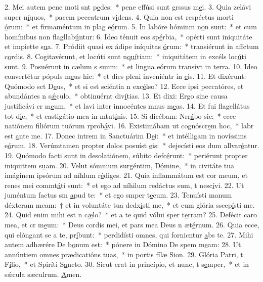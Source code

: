 2. Mei autem pene moti snt p\uline{e}des:~* pene effúsi sunt grssus m\uline{e}i.
3. Quia zelávi super n\uline{í}quos,~* pacem peccatrum v\uline{i}dens.
4. Quia non est respéctus morti \uline{ó}rum:~* et firmaméntum in plag e\uline{ó}rum.
5. In labóre hóminm n\uline{o}n sunt:~* et cum homínibus non flagllab\uline{ú}ntur:
6. Ideo ténuit eos sp\uline{é}rbia,~* opérti sunt iniquitáte et impiette s\uline{u}a.
7. Pródiit quasi ex ádipe iníquitas \uline{ó}rum:~* transiérunt in affctum c\uline{o}rdis.
8. Cogitavérunt, et locúti sunt n\uline{quí}tiam:~* iniquitátem in excéls loc\uline{ú}ti sunt.
9. Posuérunt in cælum s s\uline{u}um:~* et lingua eórum transívt in t\uline{e}rra.
10. Ideo convertétur pópuls m\uline{e}us hic:~* et dies pleni inveniéntr in \uline{e}is.
11. Et dixérunt: Quómodo sct D\uline{e}us,~* et si est sciéntia n exc\uline{é}lso?
12. Ecce ipsi peccatóres, et abundántes n s\uline{ǽ}culo,~* obtinuérnt div\uline{í}tias.
13. Et dixi: Ergo sine causa justificávi cr m\uline{e}um,~* et lavi inter innocéntes mnus m\uline{e}as.
14. Et fui flagellátus tot d\uline{i}e,~* et castigátio mea in mtut\uline{í}nis.
15. Si dicébam: Nrr\uline{á}bo sic:~* ecce natiónem filiórum tuórum rprob\uline{á}vi.
16. Existimábam ut cognóscr\uline{e}m hoc,~* labr est \uline{a}nte me.
17. Donec intrem in Sanctuárim D\uline{e}i:~* et intélligam in novíssims e\uline{ó}rum.
18. Verúmtamen propter dolos posuíst \uline{e}is:~* dejecísti eos dum allvar\uline{é}ntur.
19. Quómodo facti sunt in desolatiónem, súbito defc\uline{é}runt:~* periérunt propter iniquittem s\uline{u}am.
20. Velut sómnium surgéntim, D\uline{ó}mine,~* in civitáte tua imáginem ipsórum ad níhlum r\uline{é}diges.
21. Quia inflammátum est cor meum, et renes mei commt\uline{á}ti sunt:~* et ego ad níhilum redáctus sum, t nesc\uline{í}vi.
22. Ut juméntum factus sm \uline{a}pud te:~* et ego smper t\uline{e}cum.
23. Tenuísti manum déxteram meam:~† et in voluntáte tua dedx\uline{í}sti me,~* et cum glória sscep\uline{í}sti me.
24. Quid enim mihi est n c\uline{æ}lo?~* et a te quid vólui sper t\uline{e}rram?
25. Defécit caro mea, et cr m\uline{e}um:~* Deus cordis mei, et pars mea Deus n æt\uline{é}rnum.
26. Quia ecce, qui elóngant se a te, pr\uline{í}bunt:~* perdidísti omnes, qui fornicntur \uline{a}bs te.
27. Mihi autem adhærére De b\uline{o}num est:~* pónere in Dómino De spem m\uline{e}am:
28. Ut annúntiem omnes prædicatións t\uline{u}as,~* in portis fílæ S\uline{i}on.
29. Glória Patri, t F\uline{í}lio,~* et Spiríti S\uline{a}ncto.
30. Sicut erat in princípio, et nunc, t s\uline{e}mper,~* et in sǽcula sæculrum. \uline{A}men.

